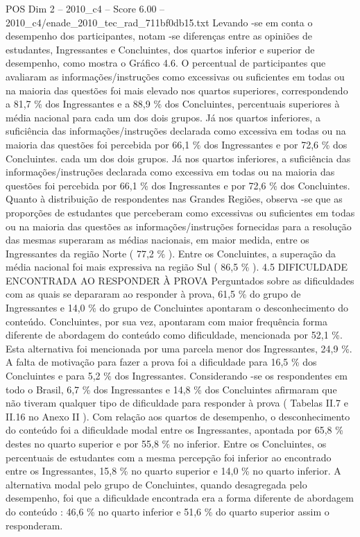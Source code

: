 \begin{textsample}{POS Dim 2 – 2010\_c4 – Score 6.00 – 2010\_c4/enade\_2010\_tec\_rad\_711bf0db15.txt}
Levando -se em conta o desempenho dos participantes, notam -se diferenças entre as opiniões de estudantes, Ingressantes e Concluintes, dos quartos inferior e superior de desempenho, como mostra o Gráfico 4.6.
O percentual de participantes que avaliaram as informações/instruções como excessivas ou suficientes em todas ou na maioria das questões foi mais elevado nos quartos superiores, correspondendo a 81,7 \% dos Ingressantes e a 88,9 \% dos Concluintes, percentuais superiores à média nacional para cada um dos dois grupos.
Já nos quartos inferiores, a suficiência das informações/instruções declarada como excessiva em todas ou na maioria das questões foi percebida por 66,1 \% dos Ingressantes e por 72,6 \% dos Concluintes. cada um dos dois grupos.
Já nos quartos inferiores, a suficiência das informações/instruções declarada como excessiva em todas ou na maioria das questões foi percebida por 66,1 \% dos Ingressantes e por 72,6 \% dos Concluintes.
Quanto à distribuição de respondentes nas Grandes Regiões, observa -se que as proporções de estudantes que perceberam como excessivas ou suficientes em todas ou na maioria das questões as informações/instruções fornecidas para a resolução das mesmas superaram as médias nacionais, em maior medida, entre os Ingressantes da região Norte ( 77,2 \% ).
Entre os Concluintes, a superação da média nacional foi mais expressiva na região Sul ( 86,5 \% ). 4.5 DIFICULDADE ENCONTRADA AO RESPONDER À PROVA Perguntados sobre as dificuldades com as quais se depararam ao responder à prova, 61,5 \% do grupo de Ingressantes e 14,0 \% do grupo de Concluintes apontaram o desconhecimento do conteúdo.
Concluintes, por sua vez, apontaram com maior frequência forma diferente de abordagem do conteúdo como dificuldade, mencionada por 52,1 \%.
Esta alternativa foi mencionada por uma parcela menor dos Ingressantes, 24,9 \%.
A falta de motivação para fazer a prova foi a dificuldade para 16,5 \% dos Concluintes e para 5,2 \% dos Ingressantes.
Considerando -se os respondentes em todo o Brasil, 6,7 \% dos Ingressantes e 14,8 \% dos Concluintes afirmaram que não tiveram qualquer tipo de dificuldade para responder à prova ( Tabelas II.7 e II.16 no Anexo II ).
Com relação aos quartos de desempenho, o desconhecimento do conteúdo foi a dificuldade modal entre os Ingressantes, apontada por 65,8 \% destes no quarto superior e por 55,8 \% no inferior.
Entre os Concluintes, os percentuais de estudantes com a mesma percepção foi inferior ao encontrado entre os Ingressantes, 15,8 \% no quarto superior e 14,0 \% no quarto inferior.
A alternativa modal pelo grupo de Concluintes, quando desagregada pelo desempenho, foi que a dificuldade encontrada era a forma diferente de abordagem do conteúdo : 46,6 \% no quarto inferior e 51,6 \% do quarto superior assim o responderam.

\end{textsample}
